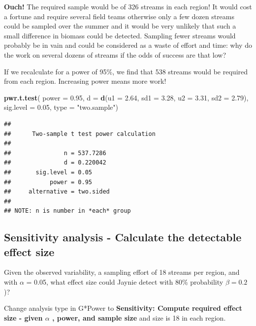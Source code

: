 \documentclass[
  12pt,
]{book}
\makeatletter
\newenvironment{Shaded}{\begin{snugshade}}{\end{snugshade}}
\newcommand{\DataTypeTok}[1]{\textcolor[rgb]{0.13,0.29,0.53}{#1}}
\newcommand{\FloatTok}[1]{\textcolor[rgb]{0.00,0.00,0.81}{#1}}
\newcommand{\KeywordTok}[1]{\textcolor[rgb]{0.13,0.29,0.53}{\textbf{#1}}}
\newcommand{\NormalTok}[1]{#1}
\newcommand{\StringTok}[1]{\textcolor[rgb]{0.31,0.60,0.02}{#1}}
\newenvironment{kframe}{%
\medskip{}
\setlength{\fboxsep}{.8em}
\def\at@end@of@kframe{}%
\ifinner\ifhmode%
 \def\at@end@of@kframe{\end{minipage}}%
 \begin{minipage}{\columnwidth}%
\fi\fi%
\def\FrameCommand##1{\hskip\@totalleftmargin \hskip-\fboxsep
\colorbox{incolor}{##1}\hskip-\fboxsep
    \hskip-\linewidth \hskip-\@totalleftmargin \hskip\columnwidth}%
\MakeFramed {\advance\hsize-\width
  \@totalleftmargin\z@ \linewidth\hsize
  \@setminipage}}%
{\par\unskip\endMakeFramed%
\at@end@of@kframe}
\newenvironment{rmdblock}[1]
 {
 \begin{itemize}
 \renewcommand{\labelitemi}{
   \raisebox{-.7\height}[0pt][0pt]{
     {\setkeys{Gin}{width=3em,keepaspectratio}\texttt{[image: images/\#1]}}
   }
 }
 \begin{kframe}
 \setlength{\fboxsep}{1em}
 \item
 }
 {
 \end{kframe}
 \end{itemize}
 }
\newenvironment{rmdcode}
  {\begin{rmdblock}{screen}}
  {\end{rmdblock}}
\makeatother
\begin{document}
\textbf{Ouch!} The required sample would be of 326 streams in each region! It would cost a fortune and require several field teams otherwise only a few dozen streams could be sampled over the summer and it would be very unlikely that such a small difference in biomass could be detected. Sampling fewer streams would probably be in vain and could be considered as a waste of effort and time: why do the work on several dozens of streams if the odds of success are that low?

If we recalculate for a power of 95\%, we find that 538 streams would be required from each region. Increasing power means more work!

\begin{Shaded}
\begin{Highlighting}[]
\KeywordTok{pwr.t.test}\NormalTok{(}
  \DataTypeTok{power =} \FloatTok{0.95}\NormalTok{,}
  \DataTypeTok{d =} \KeywordTok{d}\NormalTok{(}\DataTypeTok{u1 =} \FloatTok{2.64}\NormalTok{, }\DataTypeTok{sd1 =} \FloatTok{3.28}\NormalTok{, }\DataTypeTok{u2 =} \FloatTok{3.31}\NormalTok{, }\DataTypeTok{sd2 =} \FloatTok{2.79}\NormalTok{),}
  \DataTypeTok{sig.level =} \FloatTok{0.05}\NormalTok{,}
  \DataTypeTok{type =} \StringTok{"two.sample"}\NormalTok{)}
\end{Highlighting}
\end{Shaded}

\begin{verbatim}
## 
##      Two-sample t test power calculation 
## 
##               n = 537.7286
##               d = 0.220042
##       sig.level = 0.05
##           power = 0.95
##     alternative = two.sided
## 
## NOTE: n is number in *each* group
\end{verbatim}

\hypertarget{sensitivity-analysis---calculate-the-detectable-effect-size}{%
\subsection{Sensitivity analysis - Calculate the detectable effect size}\label{sensitivity-analysis---calculate-the-detectable-effect-size}}

Given the observed variability, a sampling effort of 18 streams per region, and with \(\alpha\) = 0.05, what effect size could Jaynie detect with 80\% probability \(\beta=0.2\))?

\begin{rmdcode}
Change analysis type in G*Power to \textbf{Sensitivity: Compute required effect size - given \(\alpha\) , power, and sample size} and size is 18 in each region.
\end{rmdcode}
\end{document}
